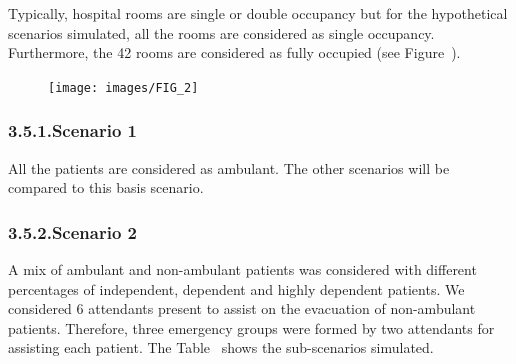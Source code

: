 \documentclass{style/llncs}
\begin{document}
\noindent{}Typically, hospital rooms are single or double occupancy but for the
hypothetical scenarios simulated, all the rooms are considered as single
occupancy. Furthermore, the 42 rooms are considered as fully occupied
(see Figure~).%

\begin{figure}[tbp]%
\begin{mdcenter}%

\noindent{}\texttt{[image: images/FIG\_2]}{}%

\mdhr{}%

\noindent{}%
\end{mdcenter}\label{path-geom}%
\end{figure}%

\subsubsection{3.5.1.\hspace*{0.5em}Scenario 1}\label{sec-scenario-1}%

\noindent{}All the patients are considered as ambulant. The other scenarios will be
compared to this basis scenario.%

\subsubsection{3.5.2.\hspace*{0.5em}Scenario 2}\label{sec-scenario-2}%

\noindent{}A mix of ambulant and non-ambulant patients was considered with different
percentages of independent, dependent and highly dependent patients. We
considered 6 attendants present to assist on the evacuation of
non-ambulant patients. Therefore, three emergency groups were formed by
two attendants for assisting each patient. The Table~ shows the
sub-scenarios simulated.%
\end{document}
